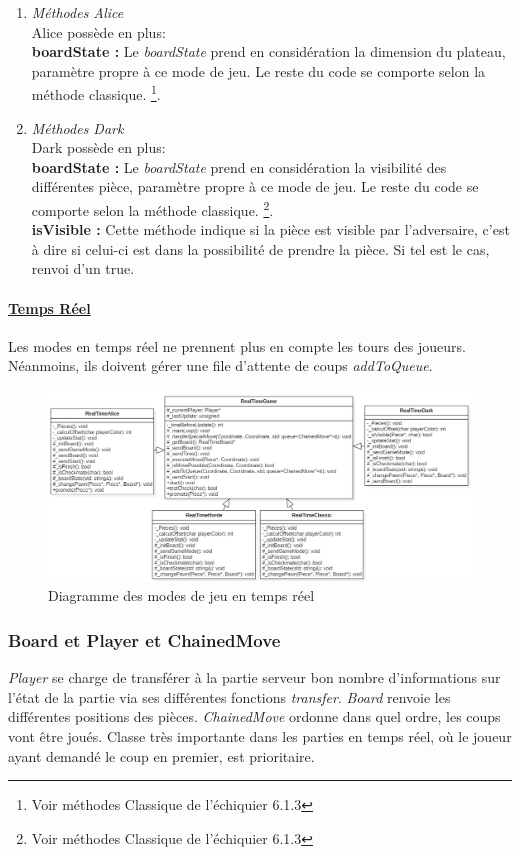 \documentclass[10pt, a4paper]{article}
\begin{document}
\begin{enumerate}
\item \textit{Méthodes Alice} \\
Alice possède en plus:\\
\textbf{boardState :} Le \textit{boardState} prend en considération la dimension du plateau, paramètre propre à ce mode de jeu. Le reste du code se comporte selon la méthode classique. \footnote{Voir méthodes Classique de l'échiquier 6.1.3}. 

\item \textit{Méthodes Dark} \\
Dark possède en plus:\\
\textbf{boardState :}  Le \textit{boardState} prend en considération la visibilité des différentes pièce, paramètre propre à ce mode de jeu. Le reste du code se comporte selon la méthode classique. \footnote{Voir méthodes Classique de l'échiquier 6.1.3}. \\
\textbf{isVisible :} Cette méthode indique si la pièce est visible par l'adversaire, c'est à dire si celui-ci est dans la possibilité de prendre la pièce. Si tel est le cas, renvoi d'un true.
\end{enumerate}

\paragraph{\underline{Temps Réel}}
Les modes en temps réel ne prennent plus en compte les tours des joueurs. Néanmoins, ils doivent gérer une file d'attente de coups \textit{addToQueue}.

\begin{figure}[H]
\centering
\includegraphics[scale=0.5]{mode_chess_realtime.png}
\caption{Diagramme des modes de jeu en temps réel}
\end{figure}

\subsubsection{Board et Player et ChainedMove}
\textit{Player} se charge de transférer à la partie serveur bon nombre d'informations sur l'état de la partie via ses différentes fonctions \textit{transfer}. \textit{Board} renvoie les différentes positions des pièces. \textit{ChainedMove} ordonne dans quel ordre, les coups vont être joués. Classe très importante dans les parties en temps réel, où le joueur ayant demandé le coup en premier, est prioritaire.
\end{document}
